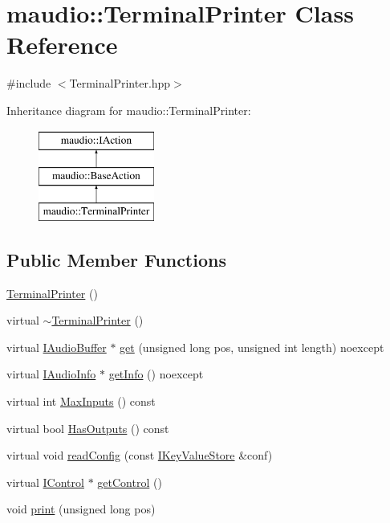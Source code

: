 \hypertarget{classmaudio_1_1TerminalPrinter}{\section{maudio\-:\-:Terminal\-Printer Class Reference}
\label{classmaudio_1_1TerminalPrinter}
}


{\ttfamily \#include $<$Terminal\-Printer.\-hpp$>$}

Inheritance diagram for maudio\-:\-:Terminal\-Printer\-:\begin{figure}[H]
\begin{center}
\leavevmode
\includegraphics[height=3.000000cm]{classmaudio_1_1TerminalPrinter}
\end{center}
\end{figure}
\subsection*{Public Member Functions}
\begin{DoxyCompactItemize}
\item 
\hyperlink{classmaudio_1_1TerminalPrinter_abd8163dacd3a72c054bcc1a3a0431a32}{Terminal\-Printer} ()
\item 
virtual \hyperlink{classmaudio_1_1TerminalPrinter_a63e4fe3cae91beb77a27461d29f78c98}{$\sim$\-Terminal\-Printer} ()
\item 
virtual \hyperlink{classmaudio_1_1IAudioBuffer}{I\-Audio\-Buffer} $\ast$ \hyperlink{classmaudio_1_1TerminalPrinter_a27f779bcd81b68ffad732a6da669f8fe}{get} (unsigned long pos, unsigned int length) noexcept
\item 
virtual \hyperlink{classmaudio_1_1IAudioInfo}{I\-Audio\-Info} $\ast$ \hyperlink{classmaudio_1_1TerminalPrinter_ae0d8b73356c360bfdd10d32ec829af85}{get\-Info} () noexcept
\item 
virtual int \hyperlink{classmaudio_1_1TerminalPrinter_af895f464f3d51be9d44750e96dabf8f1}{Max\-Inputs} () const 
\item 
virtual bool \hyperlink{classmaudio_1_1TerminalPrinter_a3fdb9711d0d767e9acd0d01b3c7644da}{Has\-Outputs} () const 
\item 
virtual void \hyperlink{classmaudio_1_1TerminalPrinter_a3888206cd622627b441ca00cca6d87e2}{read\-Config} (const \hyperlink{classmaudio_1_1IKeyValueStore}{I\-Key\-Value\-Store} \&conf)
\item 
virtual \hyperlink{classmaudio_1_1IControl}{I\-Control} $\ast$ \hyperlink{classmaudio_1_1TerminalPrinter_acef99a9118ebb6908166d8e97e7bb3e9}{get\-Control} ()
\item 
void \hyperlink{classmaudio_1_1TerminalPrinter_aff5c0d18138794ceea7fd4f4616d5b13}{print} (unsigned long pos)
\end{DoxyCompactItemize}
